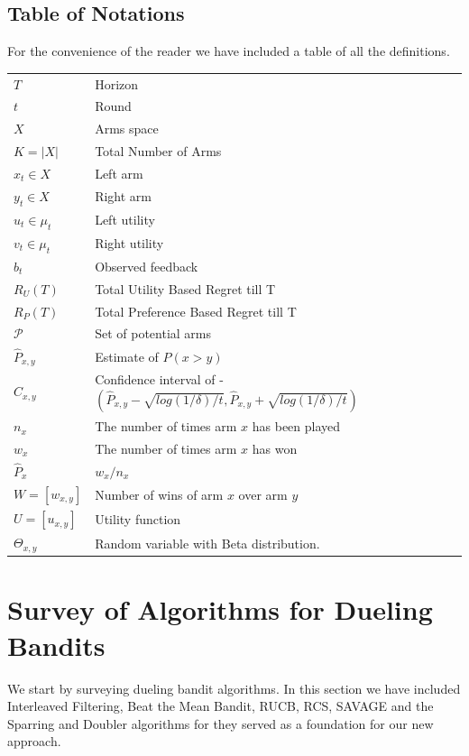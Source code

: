 \documentclass{llncs}
\begin{document}
\subsection{Table of Notations}
For the convenience of the reader we have included a table of all the definitions. 
	\begin{table}[h]
		\begin{tabular}{ll}
 			$T$ & Horizon \\
 			$t$ &  Round \\
 			$X$ & Arms space \\
 			$K = |X|$ & Total Number of Arms\\
 			$x_t \in X$ & Left arm \\
 			$y_t \in X$ & Right arm \\
 			$u_t \in \mu_t$ & Left utility \\
 			$v_t \in \mu_t$ & Right utility \\
 			$b_t$ & Observed feedback \\
 			$R_U(T)$ & Total Utility Based Regret till T\\
			$R_P(T)$ & Total Preference Based Regret till T\\
 			$\mathcal{P}$ & Set of potential arms \\
 			$\hat{P}_{x, y}$ & Estimate of $P(x>y)$\\
 			$\hat{C}_{x, y}$ &   Confidence interval of - $(\hat{P}_{x, y} - \sqrt{log(1/\delta)/t},\hat{P}_{x, y} +\sqrt{log(1/\delta)/t})$\\
 			$n_x$ &   The number of times arm $x$ has been played\\
 			$w_x$ & The number of times arm $x$ has won\\
 			$\hat{P}_x  $ &  $ w_x / n_x $\\
 			$ W = [w_{x,y}]$ & Number of wins of arm $x$ over arm $y$\\
 			$U = [u_{x,y}]$ &  Utility function\\
 			$\Theta_{x,y}$ &   Random variable with Beta distribution.
		\end{tabular}
	\end{table}

\section{Survey of Algorithms for Dueling Bandits}
	We start by surveying dueling bandit algorithms. In this section we have included Interleaved Filtering, Beat the Mean Bandit, RUCB, RCS, SAVAGE and the Sparring and Doubler algorithms for they served as a foundation for our new approach.
\end{document}
